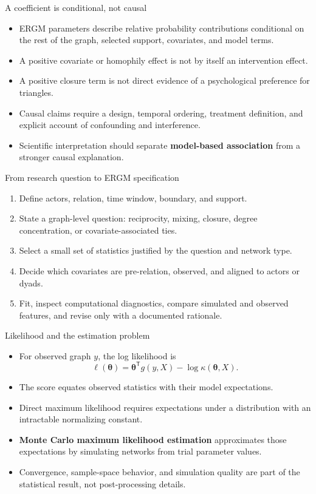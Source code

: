 \documentclass[aspectratio=169,11pt]{beamer}
\newcommand{\term}[1]{\textbf{\color{nupurple}#1}}
\begin{document}
\begin{frame}{A coefficient is conditional, not causal}
\begin{itemize}
\item ERGM parameters describe relative probability contributions conditional on the rest of the graph, selected support, covariates, and model terms.
\item A positive covariate or homophily effect is not by itself an intervention effect.
\item A positive closure term is not direct evidence of a psychological preference for triangles.
\item Causal claims require a design, temporal ordering, treatment definition, and explicit account of confounding and interference.
\item Scientific interpretation should separate \term{model-based association} from a stronger causal explanation.
\end{itemize}
\end{frame}

\begin{frame}{From research question to ERGM specification}
\begin{enumerate}
\item Define actors, relation, time window, boundary, and support.
\item State a graph-level question: reciprocity, mixing, closure, degree concentration, or covariate-associated ties.
\item Select a small set of statistics justified by the question and network type.
\item Decide which covariates are pre-relation, observed, and aligned to actors or dyads.
\item Fit, inspect computational diagnostics, compare simulated and observed features, and revise only with a documented rationale.
\end{enumerate}
\end{frame}

\begin{frame}{Likelihood and the estimation problem}
\begin{itemize}
\item For observed graph $y$, the log likelihood is
\[
\ell(\boldsymbol\theta)=\boldsymbol\theta^{\mathsf T}g(y,X)-\log\kappa(\boldsymbol\theta,X).
\]
\item The score equates observed statistics with their model expectations.
\item Direct maximum likelihood requires expectations under a distribution with an intractable normalizing constant.
\item \term{Monte Carlo maximum likelihood estimation} approximates those expectations by simulating networks from trial parameter values.
\item Convergence, sample-space behavior, and simulation quality are part of the statistical result, not post-processing details.
\end{itemize}
\end{frame}
\end{document}
